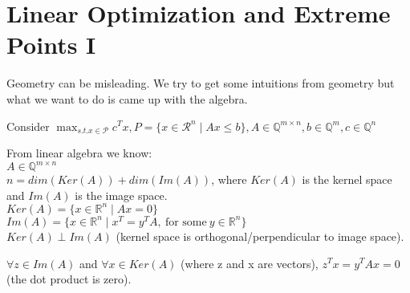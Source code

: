 \documentclass[main]{subfiles}
\begin{document}

\section{Linear Optimization and Extreme Points I}
Geometry can be misleading. We try to get some intuitions from geometry but
what we want to do is came up with the algebra.

Consider $\displaystyle \max_{s.t. x \in \mathcal{P}} c^{T}x, P = \{ x \in
\mathcal{R}^{n} \mid Ax \leq b \}, A \in \mathbb{Q}^{m \times n}, b \in
\mathbb{Q}^{m}, c \in \mathbb{Q}^{n}$

From linear algebra we know:\\
$A \in \mathbb{Q}^{m \times n}$\\
$n = dim(Ker(A)) + dim(Im(A))$, where $Ker(A)$ is the kernel space and $Im(A)$
is the image space.\\
$Ker(A) = \{ x \in \mathbb{R}^{n} \mid Ax = 0 \}$ \\
$Im(A) = \{ x \in \mathbb{R}^{n} \mid x^{T} = y^{T}A,\ \text{for some}\ y \in
\mathbb{R}^{n} \}$ \\
$Ker(A) \perp Im(A)$ (kernel space is orthogonal/perpendicular to image space).

$\forall z \in Im(A)$ and $\forall x \in Ker(A)$ (where z and x are vectors), $z^{T}x = y^{T}Ax = 0$ (the dot product is zero).

\end{document}
